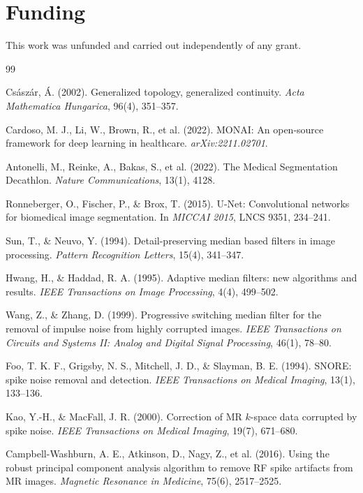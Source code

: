 \documentclass[12pt]{article}
\theoremstyle{definition}
\theoremstyle{plain}
\begin{document}
\section*{Funding}
This work was unfunded and carried out independently of any grant.

\begin{thebibliography}{99}

Cs\'asz\'ar, \'A. (2002). Generalized topology, generalized continuity.
\emph{Acta Mathematica Hungarica}, 96(4), 351--357.

Cardoso, M. J., Li, W., Brown, R., et al. (2022). MONAI: An open-source framework for
deep learning in healthcare. \emph{arXiv:2211.02701}.

Antonelli, M., Reinke, A., Bakas, S., et al. (2022). The Medical Segmentation
Decathlon. \emph{Nature Communications}, 13(1), 4128.

Ronneberger, O., Fischer, P., \& Brox, T. (2015). U-Net: Convolutional networks for
biomedical image segmentation. In \emph{MICCAI 2015}, LNCS 9351, 234--241.

Sun, T., \& Neuvo, Y. (1994). Detail-preserving median based filters in image
processing. \emph{Pattern Recognition Letters}, 15(4), 341--347.

Hwang, H., \& Haddad, R. A. (1995). Adaptive median filters: new algorithms and
results. \emph{IEEE Transactions on Image Processing}, 4(4), 499--502.

Wang, Z., \& Zhang, D. (1999). Progressive switching median filter for the removal of
impulse noise from highly corrupted images. \emph{IEEE Transactions on Circuits and
Systems II: Analog and Digital Signal Processing}, 46(1), 78--80.

Foo, T. K. F., Grigsby, N. S., Mitchell, J. D., \& Slayman, B. E. (1994). SNORE:
spike noise removal and detection. \emph{IEEE Transactions on Medical Imaging},
13(1), 133--136.

Kao, Y.-H., \& MacFall, J. R. (2000). Correction of MR $k$-space data corrupted by
spike noise. \emph{IEEE Transactions on Medical Imaging}, 19(7), 671--680.

Campbell-Washburn, A. E., Atkinson, D., Nagy, Z., et al. (2016). Using the robust
principal component analysis algorithm to remove RF spike artifacts from MR images.
\emph{Magnetic Resonance in Medicine}, 75(6), 2517--2525.


\end{thebibliography}
\end{document}
